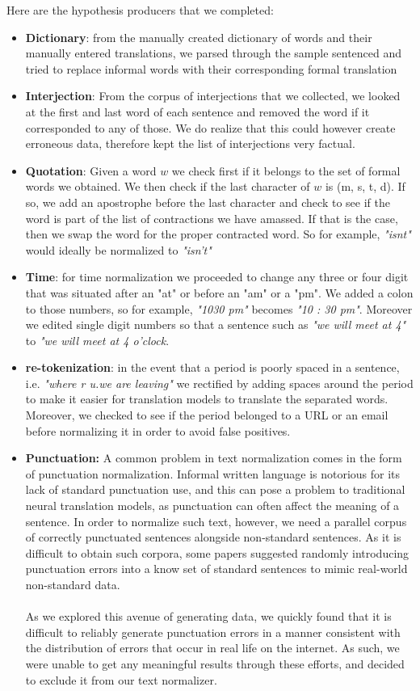 \documentclass{article}
\begin{document}
Here are the hypothesis producers that we completed:
\begin{itemize}
	\item \textbf{Dictionary}: from the manually created dictionary of words and their manually entered translations, we parsed through the sample sentenced and tried to replace informal words with their corresponding formal translation
	\item \textbf{Interjection}: From the corpus of interjections that we collected, we looked at the first and last word of each sentence and removed the word if it corresponded to any of those. We do realize that this could however create erroneous data, therefore kept the list of interjections very factual.
	\item \textbf{Quotation}: Given a word $w$ we check first if it belongs to the set of formal words we obtained. We then check if the last character of $w$ is (m, s, t, d). If so, we add an apostrophe before  the last character and check to see if the word is part of the list of contractions we have amassed. If that is the case, then we swap the word for the proper contracted word. So for example, \textit{"isnt"} would ideally be normalized to \textit{"isn't"}
	\item \textbf{Time}: for time normalization we proceeded to change any three or four digit that was  situated after an "at" or before an "am" or a "pm".  We added a colon to those numbers, so for example, \textit{"1030 pm"} becomes \textit{"10 : 30 pm"}. Moreover we edited single digit numbers so that a sentence such as \textit{"we will meet at 4"} to \textit{"we will meet at 4 o'clock}.
	\item \textbf{re-tokenization}: in the event that a period is poorly spaced in a sentence, i.e. \textit{"where r u.we are leaving"} we rectified by adding spaces around the period to make it easier for translation models to translate the separated words. Moreover, we checked to see if the period belonged to a URL or an email before normalizing it in order to avoid false positives.
	\item \textbf{Punctuation:} A common problem in text normalization comes in the form of punctuation normalization. Informal written language is notorious for its lack of standard punctuation use, and this can pose a problem to traditional neural translation models, as punctuation can often affect the meaning of a sentence. In order to normalize such text, however, we need a parallel corpus of correctly punctuated sentences alongside non-standard sentences. As it is difficult to obtain such corpora, some papers suggested randomly introducing punctuation errors into a know set of standard sentences to mimic real-world non-standard data.\\\\
As we explored this avenue of generating data, we quickly found that it is difficult to reliably generate punctuation errors in a manner consistent with the distribution of errors that occur in real life on the internet. As such, we were unable to get any meaningful results through these efforts, and decided to exclude it from our text normalizer.
\end{itemize}
\end{document}
